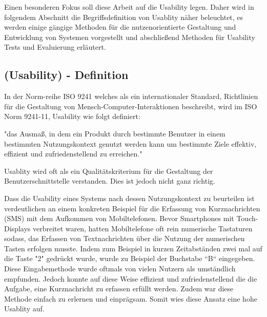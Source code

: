 Einen besonderen Fokus soll diese Arbeit auf die Usability legen. Daher wird in folgendem Abschnitt die Begriffsdefinition von Usablity näher beleuchtet, es werden einige 
gängige Methoden für die nutzenorientierte Gestaltung und Entwicklung von Systemen vorgestellt und abschließend Methoden für Usability Tests und Evaluierung erläutert. 

\subsection{(Usability) - Definition} \label{UsaDef}

In der Norm-reihe ISO 9241 welches als ein internationaler Standard, Richtlinien für die Gestaltung von Mensch-Computer-Interaktionen beschreibt, wird im ISO Norm 9241-11,  Usability wie folgt definiert:

"das Ausmaß, in dem ein Produkt durch bestimmte Benutzer in einem bestimmten Nutzungskontext genutzt werden kann um bestimmte Ziele effektiv, effizient und zufriedenstellend zu erreichen."

\cite{MichaelRichter2016; MaryBethRossonJohnM.CarrollDianeD.Cerra2002} Usablity wird  oft als ein Qualitätskriterium für die Gestaltung der Benutzerschnittstelle verstanden. Dies ist jedoch nicht ganz richtig.

Dass die Usability eines Systems nach dessen Nutzungskontext zu beurteilen ist verdeutlichen \cite{MichaelRichter2016} an einem konkreten Beispiel für die Erfassung 
von Kurznachrichten (SMS) mit dem Aufkommen von Mobiltelefonen.  Bevor Smartphones mit Touch-Displays verbreitet waren, hatten Mobiltelefone oft rein numerische Tastaturen sodass, das Erfassen 
von Textnachrichten über die Nutzung der numerischen Tasten erfolgen musste. Indem zum Beispiel in kurzen Zeitabständen zwei mal auf die Taste "2" gedrückt wurde, wurde zu Beispiel der Buchstabe ``B`` eingegeben. 
Diese Eingabemethode wurde oftmals von vielen Nutzern als umständlich empfunden. Jedoch konnte auf diese Weise effizient und zufriedenstellend die die Aufgabe, eine Kurznachricht zu erfassen erfüllt werden. 
Zudem war diese Methode einfach zu erlernen und einprägsam. Somit wies diese Ansatz eine hohe Usablity auf. 

